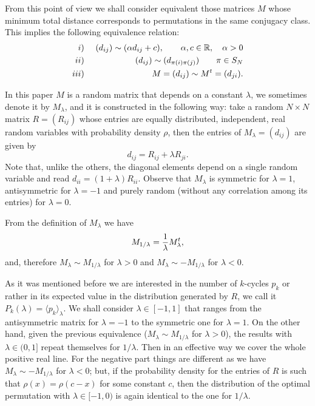 \documentclass[]{iopart}
\newcommand{\RR}{\ensuremath{\mathbb R}}
\begin{document}
{}From this point of view we shall consider equivalent those
matrices $M$ whose minimum total distance corresponds to  
permutations in the same 
conjugacy class. This implies the following equivalence relation:
\begin{eqnarray}
i)&&\ (d_{{i}{j}})\sim 
(\alpha d_{{i}{j}}+c),\qquad \alpha,c \in \RR,\quad \alpha>0\cr
ii)&&\ (d_{{i}{j}})\sim (d_{\pi(i)\pi(j)})\qquad \pi\in S_N\cr
iii)&&\ M=(d_{{i}{j}})\sim M^t=(d_{{j}{i}}).
\end{eqnarray}

In this paper $M$ is a random matrix that depends on a
constant $\lambda$, we sometimes denote it by $M_\lambda$,
and it is constructed in the following way:
take a random $N\times N$  matrix $R=(R_{{i}{j}})$ whose entries are equally 
distributed, independent, real  random variables with probability density
$\rho$, then the entries of $M_\lambda=(d_{{i}{j}})$ are given by
\begin{equation*}
d_{{i}{j}}=R_{{i}{j}}+\lambda R_{{j}{i}}.
\end{equation*}
Note that, unlike the others, the diagonal 
elements depend on a single random variable
and read $d_{{i}{i}}=(1+\lambda)R_{{i}{i}}$.
Observe that $M_\lambda$ is symmetric for $\lambda=1$,  
antisymmetric for $\lambda=-1$ and purely random (without any correlation
among its entries) for $\lambda=0$.   

{}From the definition of $M_\lambda$ we have
\begin{equation*}
M_{1/\lambda}={1\over\lambda}M_\lambda^t,
\end{equation*}
and,  therefore $M_\lambda\sim M_{1/\lambda}$ for 
$\lambda > 0$ and $M_\lambda\sim -M_{1/\lambda}$ 
for $\lambda < 0$.

As it was mentioned before we are interested in
the number of $k$-cycles $p_k$ or rather
in its expected value in the distribution
generated by $R$, we call it $P_k(\lambda)=\langle p_k\rangle_\lambda$. 
We shall consider $\lambda\in[-1,1]$ that ranges from
the antisymmetric matrix for $\lambda=-1$ 
to the symmetric one for $\lambda=1$.
On the other hand, given the previous equivalence
($M_\lambda\sim M_{1/\lambda}$ for $\lambda>0$),
the results with $\lambda\in(0,1]$ repeat
themselves for $1/\lambda$.
Then in an effective way we cover 
the whole positive real line.
For the negative part things are different
as we have $M_\lambda\sim -M_{1/\lambda}$ for $\lambda<0$;
but, if the probability density for the entries of $R$ is
such that $\rho(x)=\rho(c-x)$ for some constant $c$, then
the distribution of the optimal permutation with $\lambda\in[-1,0)$ 
is again identical to the one for $1/\lambda$.
\end{document}
